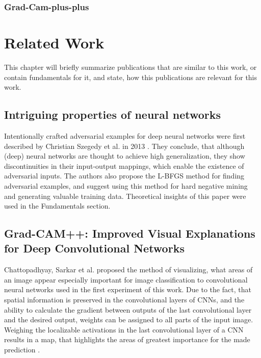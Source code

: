 \documentclass[draft,final]{vutinfth} %
\begin{document}
\subsection{Grad-Cam-plus-plus}
\cite{Chattopadhyay2017}
\label{section:grad_cam}

\chapter{Related Work}

This chapter will briefly summarize publications that are similar to this work, or contain fundamentals for it, and state, how this publications are relevant for this work.

\section{Intriguing properties of neural networks}

Intentionally crafted adversarial examples for deep neural networks were first described by Christian Szegedy et al. in 2013 \cite{Szegedy2013}.
They conclude, that although (deep) neural networks are thought to achieve high generalization, they show discontinuities in their input-output mappings, which enable the existence of adversarial inputs.
The authors also propose the L-BFGS method for finding adversarial examples, and suggest using this method for hard negative mining and generating valuable training data.
Theoretical insights of this paper were used in the Fundamentals section.\\
\section{Grad-CAM++: Improved Visual Explanations for Deep Convolutional Networks}
Chattopadhyay, Sarkar et al. proposed the method of visualizing, what areas of an image appear especially important for image classification to convolutional neural networks used in the first experiment of this work. 
Due to the fact, that spatial information is preserved in the convolutional layers of CNNs, and the ability to calculate the gradient between outputs of the last convolutional layer and the desired output, weights can be assigned to all parts of the input image.
Weighing the localizable activations in the last convolutional layer of a CNN results in a map, that highlights the areas of greatest importance for the made prediction \cite{Chattopadhyay2017}.
\end{document}

